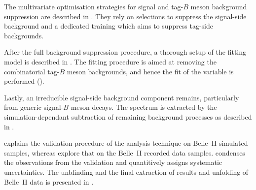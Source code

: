 The
multivariate optimisation strategies for signal and tag-$B$ meson background suppression are described in 
.
They rely on selections to suppress the signal-side background and a dedicated \BDT training which aims to suppress tag-side backgrounds.

After the full background suppression procedure, a thorough setup of the fitting model is described in .
The fitting procedure is aimed at removing the combinatorial tag-$B$ meson backgrounds, and hence the fit of the \Mbc variable is performed ().

Lastly, an irreducible signal-side background component remains, particularly from generic signal-$B$ meson decays.
The \EB spectrum is extracted by the simulation-dependant subtraction of remaining background processes as described in .

 explains the validation procedure of the analysis technique on Belle~II simulated samples,
whereas  explore that on the Belle~II recorded data samples.
 condenses the observations from the validation and quantitively assigns systematic uncertainties.
The unblinding and the final extraction of results and unfolding of Belle~II data is presented in .
